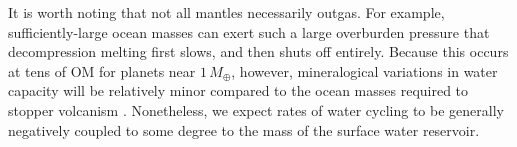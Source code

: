It is worth noting that not all mantles necessarily outgas. For example, sufficiently-large ocean masses can exert such a large overburden pressure that decompression melting first slows, and then shuts off entirely. Because this occurs at tens of OM for planets near $1\,M_\oplus$, however, mineralogical variations in water capacity will be relatively minor compared to the ocean masses required to stopper volcanism \citep{kite2009geodynamics, noack_waterrich_2016}. Nonetheless, we expect rates of water cycling to be generally negatively coupled to some degree to the mass of the surface water reservoir. %









